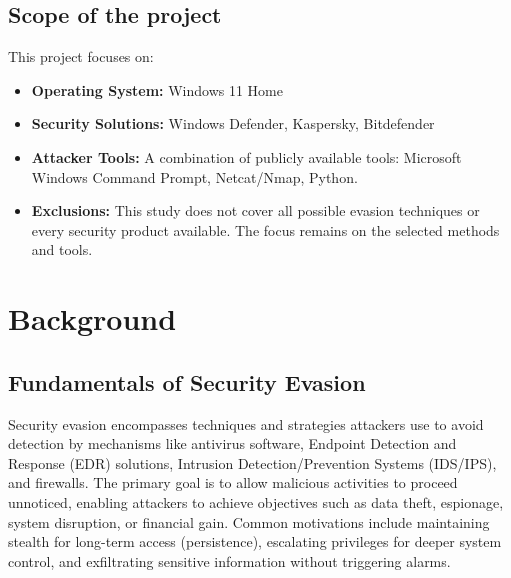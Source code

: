 \documentclass[11pt]{article}
\begin{document}
	\subsection{Scope of the project}
	This project focuses on:
	\begin{itemize}
		\item \textbf{Operating System:} Windows 11 Home
		\item \textbf{Security Solutions:} Windows Defender, Kaspersky, Bitdefender
		\item \textbf{Attacker Tools:} A combination of publicly available tools: Microsoft Windows Command Prompt, Netcat/Nmap, Python.
		\item \textbf{Exclusions:} This study does not cover all possible evasion techniques or every security product available. The focus remains on the selected methods and tools.
	\end{itemize}
	
	
	
	\section{Background}
	\subsection{Fundamentals of Security Evasion}
	Security evasion encompasses techniques and strategies attackers use to avoid detection by mechanisms like antivirus software, Endpoint Detection and Response (EDR) solutions, Intrusion Detection/Prevention Systems (IDS/IPS), and firewalls. The primary goal is to allow malicious activities to proceed unnoticed, enabling attackers to achieve objectives such as data theft, espionage, system disruption, or financial gain. Common motivations include maintaining stealth for long-term access (persistence), escalating privileges for deeper system control, and exfiltrating sensitive information without triggering alarms.
	
\end{document}
